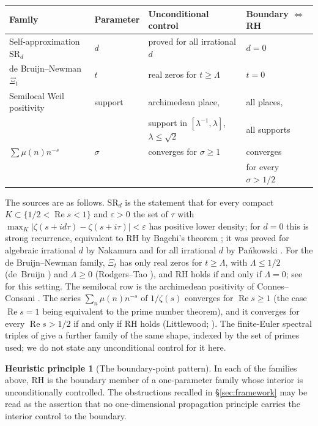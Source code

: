 \documentclass[11pt]{amsart}
\theoremstyle{definition}
\newtheorem{principle}[theorem]{Heuristic principle}
\theoremstyle{remark}
\DeclareMathOperator{\Real}{Re}
\begin{document}
\begin{center}
\renewcommand{\arraystretch}{1.3}
\begin{tabular}{llll}
\textbf{Family} & \textbf{Parameter} & \textbf{Unconditional control} & \textbf{Boundary $\iff$ RH}\\
\hline
Self-approximation $\mathrm{SR}_d$ & $d$ & proved for all irrational $d$ & $d=0$\\
de Bruijn--Newman $\Xi_t$ & $t$ & real zeros for $t\geq\Lambda$ & $t=0$\\
Semilocal Weil positivity & support & archimedean place, & all places,\\
 & & support in $[\lambda^{-1},\lambda]$, $\lambda\le\sqrt2$ & all supports\\
$\sum\mu(n)n^{-s}$ & $\sigma$ & converges for $\sigma\ge1$ & converges\\
 & & & for every $\sigma>1/2$\\
\end{tabular}
\end{center}

The sources are as follows. $\mathrm{SR}_d$ is the statement that for every compact
$K\subset\{1/2<\Real s<1\}$ and $\varepsilon>0$ the set of $\tau$ with
$\max_K|\zeta(s+id\tau)-\zeta(s+i\tau)|<\varepsilon$ has positive lower density; for $d=0$ this
is strong recurrence, equivalent to RH by Bagchi's theorem \cite{Bagchi}; it was proved for
algebraic irrational $d$ by Nakamura \cite{Nak09} and for all irrational $d$ by Pa\'nkowski
\cite{Pan10}. For the de Bruijn--Newman family, $\Xi_t$ has only real zeros for $t\ge\Lambda$,
with $\Lambda\le1/2$ (de~Bruijn \cite{dB}) and $\Lambda\ge0$ (Rodgers--Tao \cite{RT}), and RH
holds if and only if $\Lambda=0$; see \cite{P13} for this setting. The semilocal row is the
archimedean positivity of Connes--Consani \cite{CC21}. The series $\sum_n\mu(n)n^{-s}$ of
$1/\zeta(s)$ converges for $\Real s\ge1$ (the case $\Real s=1$ being equivalent to the prime
number theorem), and it converges for every $\Real s>1/2$ if and only if RH holds (Littlewood;
\cite[Thm.~14.25(A)]{Tit}). The finite-Euler spectral triples of
\cite{CCM25} give a further family of the same shape, indexed by the set of primes used; we do
not state any unconditional control for it here.

\begin{principle}[The boundary-point pattern]\label{prin:boundary}\sloppy
In each of the families above, RH is the boundary member of a one-parameter family whose
interior is unconditionally controlled. The obstructions recalled in \S\ref{sec:framework} may
be read as the assertion that no one-dimensional propagation principle carries the interior
control to the boundary.
\end{principle}
\end{document}

